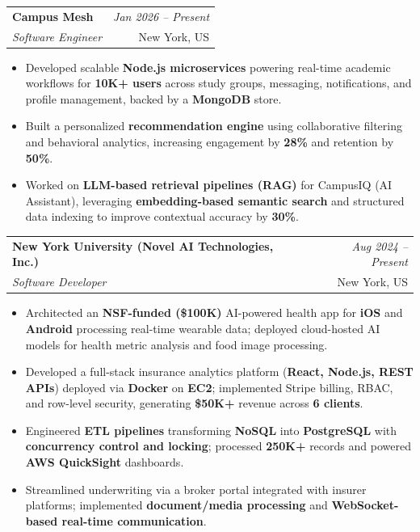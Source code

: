 \documentclass[a4paper,10pt]{article}
\makeatletter
\newcommand{\resumeSubheading}[4]{
\vspace{0.3mm}\item
    \begin{tabular*}{0.98\textwidth}[t]{l@{\extracolsep{\fill}}r}
        \textbf{#1} & \textit{\footnotesize{#4}} \\
        \textit{\footnotesize{#3}} & \footnotesize{#2}\\
    \end{tabular*}\vspace{-2mm}
}
\newcommand{\resumeItemListStart}{\begin{itemize}[leftmargin=*, labelsep=1mm, itemsep=0pt]}
\newcommand{\resumeItemListEnd}{\end{itemize}\vspace{-2mm}}
\makeatother
\begin{document}
\resumeSubheading
{Campus Mesh}{New York, US}
{Software Engineer}{Jan 2026 -- Present}
\resumeItemListStart
\item \footnotesize{Developed scalable \textbf{Node.js microservices} powering real-time academic workflows for \textbf{10K+ users} across study groups, messaging, notifications, and profile management, backed by a \textbf{MongoDB} store.}
\item \footnotesize{Built a personalized \textbf{recommendation engine} using collaborative filtering and behavioral analytics, increasing engagement by \textbf{28\%} and retention by \textbf{50\%}.}
\item \footnotesize{Worked on \textbf{LLM-based retrieval pipelines (RAG)} for CampusIQ (AI Assistant), leveraging \textbf{embedding-based semantic search} and structured data indexing to improve contextual accuracy by \textbf{30\%}.}
\resumeItemListEnd

\resumeSubheading
{New York University (Novel AI Technologies, Inc.)}{New York, US}
{Software Developer}{Aug 2024 -- Present}
\resumeItemListStart
\item \footnotesize{Architected an \textbf{NSF-funded (\$100K)} AI-powered health app for \textbf{iOS} and \textbf{Android} processing real-time wearable data; deployed cloud-hosted AI models for health metric analysis and food image processing.}
\item \footnotesize{Developed a full-stack insurance analytics platform (\textbf{React, Node.js, REST APIs}) deployed via \textbf{Docker} on \textbf{EC2}; implemented Stripe billing, RBAC, and row-level security, generating \textbf{\$50K+} revenue across \textbf{6 clients}.}
\item \footnotesize{Engineered \textbf{ETL pipelines} transforming \textbf{NoSQL} into \textbf{PostgreSQL} with \textbf{concurrency control and locking}; processed \textbf{250K+} records and powered \textbf{AWS QuickSight} dashboards.}
\item \footnotesize{Streamlined underwriting via a broker portal integrated with insurer platforms; implemented \textbf{document/media processing} and \textbf{WebSocket-based real-time communication}.}
\resumeItemListEnd
\end{document}
